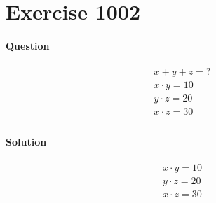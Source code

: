 \documentclass{article}
\begin{document}


\section{Exercise 1002}

\paragraph{Question}
\begin{align*}
	x + y + z = ?  \\
	x \cdot y = 10 \\
	y \cdot z = 20 \\
	x \cdot z = 30 \\
\end{align*}

\paragraph{Solution}
\begin{align*}
	x \cdot y = 10 \\
	y \cdot z = 20 \\
	x \cdot z = 30 \\
\end{align*}

\end{document}
